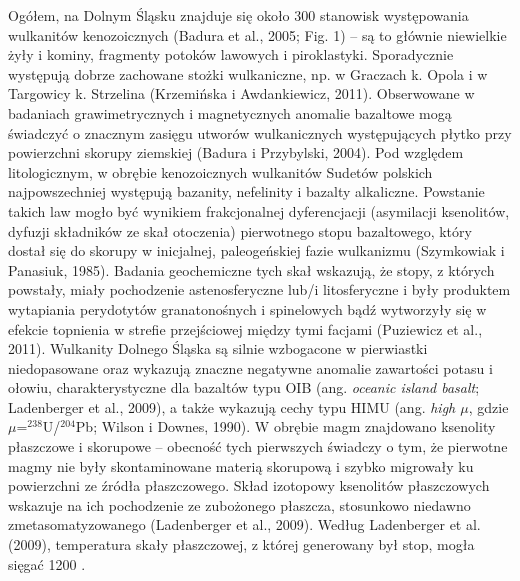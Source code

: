 \documentclass[11.5pt,twoside]{report}
\begin{document}

Ogółem, na Dolnym Śląsku znajduje się około 300 stanowisk występowania wulkanitów kenozoicznych (Badura et al., 2005; Fig. 1) -- są to głównie niewielkie żyły i kominy, fragmenty potoków lawowych i piroklastyki. Sporadycznie występują dobrze zachowane stożki wulkaniczne, np. w Graczach k. Opola i w Targowicy k. Strzelina (Krzemińska i Awdankiewicz, 2011). Obserwowane w badaniach grawimetrycznych i magnetycznych anomalie bazaltowe mogą świadczyć o znacznym zasięgu utworów wulkanicznych występujących płytko przy powierzchni skorupy ziemskiej (Badura i Przybylski, 2004). Pod względem litologicznym, w obrębie kenozoicznych wulkanitów Sudetów polskich najpowszechniej występują bazanity, nefelinity i bazalty alkaliczne. Powstanie takich law mogło być wynikiem frakcjonalnej dyferencjacji (asymilacji ksenolitów, dyfuzji składników ze skał otoczenia) pierwotnego stopu bazaltowego, który dostał się do skorupy w inicjalnej, paleogeńskiej fazie wulkanizmu (Szymkowiak i Panasiuk, 1985). Badania geochemiczne tych skał wskazują, że stopy, z których powstały, miały pochodzenie astenosferyczne lub/i litosferyczne i były produktem wytapiania perydotytów granatonośnych i spinelowych bąd\'{z} wytworzyły się w efekcie topnienia w strefie przejściowej między tymi facjami (Puziewicz et al., 2011). Wulkanity Dolnego Śląska są silnie wzbogacone w pierwiastki niedopasowane oraz wykazują znaczne negatywne anomalie zawartości potasu i ołowiu, charakterystyczne dla bazaltów typu OIB (ang. \textit{oceanic island basalt}; Ladenberger et al., 2009), a także wykazują cechy typu HIMU (ang. \textit{high $\mu$}, gdzie $\mu$=$^{238}$U/$^{204}$Pb; Wilson i Downes, 1990). W obrębie magm znajdowano ksenolity płaszczowe i skorupowe -- obecność tych pierwszych świadczy o tym, że pierwotne magmy nie były skontaminowane materią skorupową i szybko migrowały ku powierzchni ze \'{z}ródła płaszczowego. Skład izotopowy ksenolitów płaszczowych wskazuje na ich pochodzenie ze zubożonego płaszcza, stosunkowo niedawno zmetasomatyzowanego (Ladenberger et al., 2009). Według Ladenberger et al. (2009), temperatura skały płaszczowej, z której generowany był stop, mogła sięgać 1200 \textcelsius.
\end{document}
